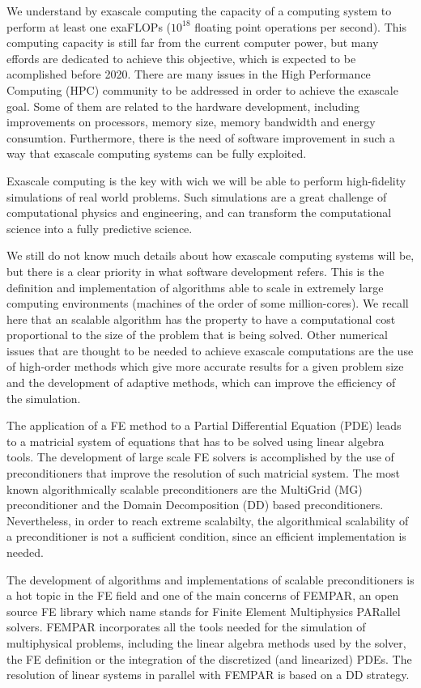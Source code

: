 We understand by exascale computing the capacity of a computing system to perform at least one exaFLOPs ($ 10^{18} $ floating point operations per second). This computing capacity is still far from the current computer power, but many effords are dedicated to achieve this objective, which is expected to be acomplished before 2020. There are many issues in the High Performance Computing (HPC) community to be addressed in order to achieve the exascale goal. Some of them are related to the hardware development, including improvements on processors, memory size, memory bandwidth and energy consumtion. Furthermore, there is the need of software improvement in such a way that exascale computing systems can be fully exploited.

Exascale computing is the key with wich we will be able to perform high-fidelity simulations of real world problems. Such simulations are a great challenge of computational physics and engineering, and can transform the computational science into a fully predictive science.

We still do not know much details about how exascale computing systems will be, but there is a clear priority in what software development refers. This is the definition and implementation of algorithms able to scale in extremely large computing environments (machines of the order of some million-cores). We recall here that an scalable algorithm has the property to have a computational cost proportional to the size of the problem that is being solved. Other numerical issues that are thought to be needed to achieve exascale computations are the use of high-order methods which give more accurate results for a given problem size and the development of adaptive methods, which can improve the efficiency of the simulation.

The application of a FE method to a Partial Differential Equation (PDE) leads to a matricial system of equations that has to be solved using linear algebra tools. The development of large scale FE solvers is accomplished by the use of preconditioners that improve the resolution of such matricial system. The most known algorithmically scalable preconditioners are the MultiGrid (MG) preconditioner and the Domain Decomposition (DD) based preconditioners. Nevertheless, in order to reach extreme scalabilty, the algorithmical scalability of a preconditioner is not a sufficient condition, since an efficient implementation is needed. 

The development of algorithms and implementations of scalable preconditioners is a hot topic in the FE field and one of the main concerns of FEMPAR, an open source FE library which name stands for Finite Element Multiphysics PARallel solvers. FEMPAR incorporates all the tools needed for the simulation of multiphysical problems, including the linear algebra methods used by the solver, the FE definition or the integration of the discretized (and linearized) PDEs. The resolution of linear systems in parallel with FEMPAR is based on a DD strategy.

